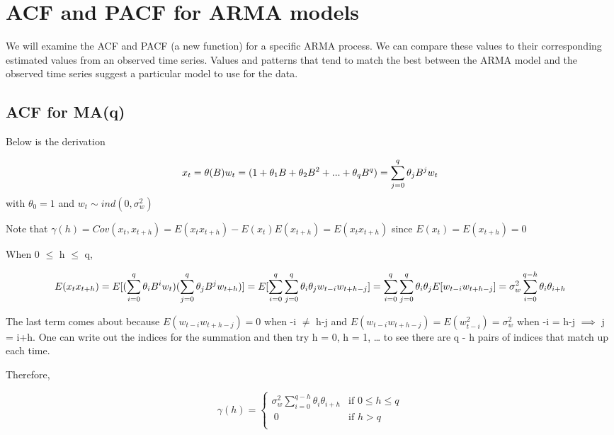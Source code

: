 \documentclass[
]{book}
\theoremstyle{definition}
\theoremstyle{definition}
\theoremstyle{definition}
\theoremstyle{definition}
\theoremstyle{remark}
\begin{document}
\hypertarget{acf-and-pacf-for-arma-models}{%
\chapter{ACF and PACF for ARMA models}\label{acf-and-pacf-for-arma-models}}

We will examine the ACF and PACF (a new function) for a specific ARMA process. We can compare these values to their corresponding estimated values from an observed time series. Values and patterns that tend to match the best between the ARMA model and the observed time series suggest a particular model to use for the data.

\hypertarget{acf-for-maq}{%
\section{ACF for MA(q)}\label{acf-for-maq}}

Below is the derivation

\[x_t=\theta(B)w_t\\
=(1+\theta_1B+\theta_2B^2+...+\theta_qB^q)\\
=\sum_{j=0}^{q}\theta_jB^jw_t\] with \(\theta_0=1\) and \(w_t\sim ind(0,\sigma_w^2)\)

Note that \(\gamma(h)=Cov(x_t,x_{t+h})=E(x_tx_{t+h})-E(x_t)E(x_{t+h})=E(x_tx_{t+h})\) since \(E(x_t)=E(x_{t+h})=0\)

When 0 \(\le\) h \(\le\) q,

\[E(x_tx_{t+h})\\
=E[(\sum_{i=0}^{q}\theta_iB^iw_t)(\sum_{j=0}^{q}\theta_jB^jw_{t+h})]\\
=E[\sum_{i=0}^{q}\sum_{j=0}^{q}\theta_i\theta_jw_{t-i}w_{t+h-j}]\\
=\sum_{i=0}^{q}\sum_{j=0}^{q}\theta_i\theta_jE[w_{t-i}w_{t+h-j}]\\
=\sigma_w^2\sum_{i=0}^{q-h}\theta_i\theta_{i+h}\]

The last term comes about because \(E(w_{t-i}w_{t+h-j}) = 0\) when -i \(\ne\) h-j and \(E(w_{t-i}w_{t+h-j}) = E(w_{t-i}^2) = \sigma_w^2\) when -i = h-j \(\implies\) j = i+h. One can write out the indices for the summation and then try h = 0, h = 1, \ldots{} to see there are q - h pairs of indices that match up each time.

Therefore,

\[
\gamma(h)=
\begin{cases}
    \sigma_w^2\sum_{i=0}^{q-h}\theta_i\theta_{i+h} & \text{if } 0 \le h \le q \\
    \ 0 & \text{if } h>q \\
\end{cases}
\]
\end{document}
